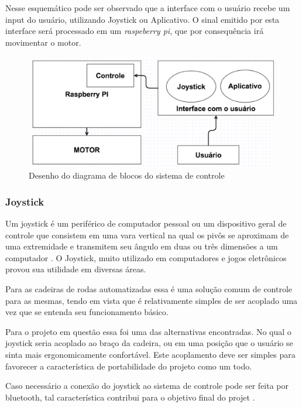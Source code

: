 Nesse esquemático pode ser observado que a interface com o usuário recebe um input do usuário, utilizando Joystick ou Aplicativo. O sinal emitido por esta interface será processado em um \textit{raspeberry pi}, que por consequência irá movimentar o motor.

\begin{figure}[!htb]
\centering
  \includegraphics[keepaspectratio=true,scale=0.6]{figuras/controle/diagrama_blocos}
\caption{Desenho do diagrama de blocos do sistema de controle}
\label{fig:diagrama_blocos}
\end{figure}

\subsubsection{Joystick}
Um joystick é um periférico de computador pessoal ou um dispositivo geral de controle que consistem em uma vara vertical na qual os pivôs se aproximam de uma extremidade e transmitem seu ângulo em duas ou três dimensões a um computador \cite{livro_creating_games}. O Joystick, muito utilizado em computadores e jogos eletrônicos provou sua utilidade em diversas áreas.

Para as cadeiras de rodas automatizadas essa é uma solução comum de controle para as mesmas, tendo em vista que é relativamente simples de ser acoplado uma vez que se entenda seu funcionamento básico.

Para o projeto em questão essa foi uma das alternativas encontradas. No qual o joystick seria acoplado ao braço da cadeira, ou em uma posição que o usuário se sinta mais ergonomicamente confortável. Este acoplamento deve ser simples para favorecer a característica de portabilidade do projeto como um todo.

Caso necessário a conexão do joystick ao sistema de controle pode ser feita por bluetooth, tal característica contribui para o objetivo final do projet \cite{artigo_joystick_controller}.

